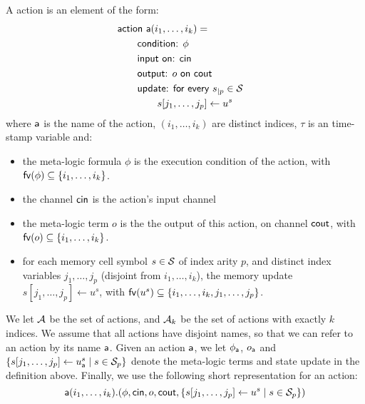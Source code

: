 \begin{definition} \label{def:action}
  A action is an element of the form:
    \[
      \begin{aligned}
        &\lefteqn{\textsf{action } \sfa(i_1, \dots, i_k) =}\\
        &\quad&&\textsf{condition: } \phi\\
        &     &&\textsf{input on: } \cin\\
        &     &&\textsf{output: } o \textsf{ on } \cout\\
        &     &&\textsf{update: for every $s_{|p} \in \States$}\\
        &     &&\qquad s[j_1,\dots,j_p] \leftarrow u^{s}
      \end{aligned}
    \]
  where $\textsf{a}$ is the name of the action, $(i_1,\ldots,i_k)$ are distinct indices, $\tau$ is an time-stamp variable and:
  \begin{itemize}
  \item the meta-logic formula $\phi$ is the execution condition of the action, with $\mathsf{fv}(\phi) \subseteq \{i_1,\dots, i_k\}$. %
  \item the channel $\mathsf{cin}$ is the action's input channel
  \item the meta-logic term $o$ is the the output of this action, on channel $\mathsf{cout}$, with $\mathsf{fv}(o) \subseteq \{i_1,\dots, i_k\}$. %
  \item for each memory cell symbol $s \in \mathcal{S}$ of index arity $p$, and distinct index variables $j_1,\ldots,j_p$ (disjoint from $i_1,\dots, i_k$), the memory update $s[j_1,\dots,j_p] \leftarrow u^{s}$, with $\mathsf{fv}(u^s) \subseteq \{i_1,\dots, i_k, j_1, \dots, j_p\}$. %
  \end{itemize}
  We let $\mathcal{A}$ be the set of actions, and $\mathcal{A}_k$ be the set of actions with exactly $k$ indices. We assume that all actions have disjoint names, so that we can refer to an action by its name $\textsf{a}$. Given an action $\textsf{a}$, we let $\phi_{\textsf{a}}$, $o_{\textsf{a}}$ and $\{s[j_1,\dots, j_p] \leftarrow u_{\textsf{a}}^{s} \mid s \in \mathcal{S}_{p}\}$ denote the meta-logic terms and state update in the definition above. 
  Finally, we use the following short representation for an action:
  \[
    \textsf{a}(i_1,\dots,i_k).(\phi, \mathsf{cin}, o, \mathsf{cout},
    \{s[j_1,\dots, j_p] \leftarrow u^{s} \mid s \in \mathcal{S}_{p}\})
  \]
\end{definition}

